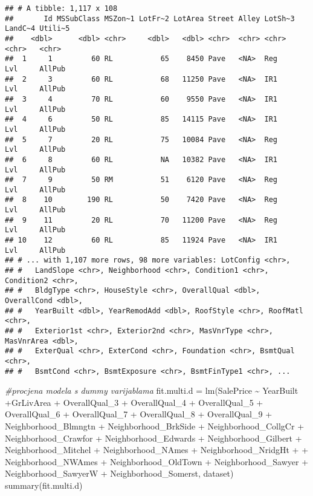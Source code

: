 \documentclass[
]{article}
\newenvironment{Shaded}{\begin{snugshade}}{\end{snugshade}}
\newcommand{\CommentTok}[1]{\textcolor[rgb]{0.56,0.35,0.01}{\textit{#1}}}
\newcommand{\FunctionTok}[1]{\textcolor[rgb]{0.00,0.00,0.00}{#1}}
\newcommand{\NormalTok}[1]{#1}
\newcommand{\OtherTok}[1]{\textcolor[rgb]{0.56,0.35,0.01}{#1}}
\newcommand{\SpecialCharTok}[1]{\textcolor[rgb]{0.00,0.00,0.00}{#1}}
\begin{document}
\begin{verbatim}
## # A tibble: 1,117 x 108
##       Id MSSubClass MSZon~1 LotFr~2 LotArea Street Alley LotSh~3 LandC~4 Utili~5
##    <dbl>      <dbl> <chr>     <dbl>   <dbl> <chr>  <chr> <chr>   <chr>   <chr>  
##  1     1         60 RL           65    8450 Pave   <NA>  Reg     Lvl     AllPub 
##  2     3         60 RL           68   11250 Pave   <NA>  IR1     Lvl     AllPub 
##  3     4         70 RL           60    9550 Pave   <NA>  IR1     Lvl     AllPub 
##  4     6         50 RL           85   14115 Pave   <NA>  IR1     Lvl     AllPub 
##  5     7         20 RL           75   10084 Pave   <NA>  Reg     Lvl     AllPub 
##  6     8         60 RL           NA   10382 Pave   <NA>  IR1     Lvl     AllPub 
##  7     9         50 RM           51    6120 Pave   <NA>  Reg     Lvl     AllPub 
##  8    10        190 RL           50    7420 Pave   <NA>  Reg     Lvl     AllPub 
##  9    11         20 RL           70   11200 Pave   <NA>  Reg     Lvl     AllPub 
## 10    12         60 RL           85   11924 Pave   <NA>  IR1     Lvl     AllPub 
## # ... with 1,107 more rows, 98 more variables: LotConfig <chr>,
## #   LandSlope <chr>, Neighborhood <chr>, Condition1 <chr>, Condition2 <chr>,
## #   BldgType <chr>, HouseStyle <chr>, OverallQual <dbl>, OverallCond <dbl>,
## #   YearBuilt <dbl>, YearRemodAdd <dbl>, RoofStyle <chr>, RoofMatl <chr>,
## #   Exterior1st <chr>, Exterior2nd <chr>, MasVnrType <chr>, MasVnrArea <dbl>,
## #   ExterQual <chr>, ExterCond <chr>, Foundation <chr>, BsmtQual <chr>,
## #   BsmtCond <chr>, BsmtExposure <chr>, BsmtFinType1 <chr>, ...
\end{verbatim}

\begin{Shaded}
\begin{Highlighting}[]
\CommentTok{\#procjena modela s dummy varijablama}
\NormalTok{fit.multi.d }\OtherTok{=} \FunctionTok{lm}\NormalTok{(SalePrice }\SpecialCharTok{\textasciitilde{}}\NormalTok{ YearBuilt }\SpecialCharTok{+}\NormalTok{GrLivArea }\SpecialCharTok{+}\NormalTok{ OverallQual\_3 }\SpecialCharTok{+}\NormalTok{ OverallQual\_4 }\SpecialCharTok{+}\NormalTok{ OverallQual\_5 }\SpecialCharTok{+}\NormalTok{ OverallQual\_6 }\SpecialCharTok{+}\NormalTok{ OverallQual\_7 }\SpecialCharTok{+}\NormalTok{ OverallQual\_8 }\SpecialCharTok{+}\NormalTok{ OverallQual\_9 }\SpecialCharTok{+}\NormalTok{ Neighborhood\_Blmngtn }\SpecialCharTok{+}\NormalTok{ Neighborhood\_BrkSide }\SpecialCharTok{+}\NormalTok{ Neighborhood\_CollgCr }\SpecialCharTok{+}\NormalTok{ Neighborhood\_Crawfor }\SpecialCharTok{+}\NormalTok{ Neighborhood\_Edwards }\SpecialCharTok{+}\NormalTok{ Neighborhood\_Gilbert }\SpecialCharTok{+}\NormalTok{ Neighborhood\_Mitchel }\SpecialCharTok{+}\NormalTok{ Neighborhood\_NAmes }\SpecialCharTok{+}\NormalTok{ Neighborhood\_NridgHt }\SpecialCharTok{+} \SpecialCharTok{+}\NormalTok{ Neighborhood\_NWAmes }\SpecialCharTok{+}\NormalTok{ Neighborhood\_OldTown }\SpecialCharTok{+}\NormalTok{ Neighborhood\_Sawyer }\SpecialCharTok{+}\NormalTok{ Neighborhood\_SawyerW }\SpecialCharTok{+}\NormalTok{  Neighborhood\_Somerst, dataset)}
\FunctionTok{summary}\NormalTok{(fit.multi.d)}
\end{Highlighting}
\end{Shaded}
\end{document}
